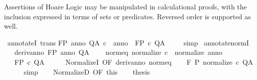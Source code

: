 \begin{isabellebody}
\begin{isamarkuptext}
 \medskip Assertions of Hoare Logic may be manipulated in
 calculational proofs, with the inclusion expressed in terms of sets
 or predicates.  Reversed order is supported as well.%
\end{isamarkuptext}\isamarkuptrue%
\isamarkupfalse%
\ annotateI\ {\isacharbrackleft}trans{\isacharbrackright}{\isacharcolon}\isanewline
{\isachardoublequoteopen}{\isasymlbrakk}{\isasymGamma}{\isacharcomma}{\isasymTheta}{\isasymturnstile}\isactrlbsub {\isacharslash}F\isactrlesub P\ anno\ Q{\isacharcomma}A{\isacharsemicolon}\ c\ {\isacharequal}\ anno{\isasymrbrakk}\ {\isasymLongrightarrow}\ {\isasymGamma}{\isacharcomma}{\isasymTheta}{\isasymturnstile}\isactrlbsub {\isacharslash}F\isactrlesub P\ c\ Q{\isacharcomma}A{\isachardoublequoteclose}\ \isanewline
%
\isadelimproof
\ \ %
\endisadelimproof
%
\isatagproof
{}\isamarkupfalse%
\ simp%
\endisatagproof
{\isafoldproof}%
%
\isadelimproof
\isanewline
%
\endisadelimproof
\isanewline
{}\isamarkupfalse%
\ annotate{\isacharunderscore}normI{\isacharcolon}\isanewline
\ \ \ deriv{\isacharunderscore}anno{\isacharcolon}\ {\isachardoublequoteopen}{\isasymGamma}{\isacharcomma}{\isasymTheta}{\isasymturnstile}\isactrlbsub {\isacharslash}F\isactrlesub P\ anno\ Q{\isacharcomma}A{\isachardoublequoteclose}\ \isanewline
\ \ \ norm{\isacharunderscore}eq{\isacharcolon}\ {\isachardoublequoteopen}normalize\ c\ {\isacharequal}\ normalize\ anno{\isachardoublequoteclose}\ \isanewline
\ \ \ {\isachardoublequoteopen}{\isasymGamma}{\isacharcomma}{\isasymTheta}{\isasymturnstile}\isactrlbsub {\isacharslash}F\isactrlesub P\ c\ Q{\isacharcomma}A{\isachardoublequoteclose}\isanewline
%
\isadelimproof
%
\endisadelimproof
%
\isatagproof
{}\isamarkupfalse%
\ {\isacharminus}\isanewline
\ \ \isamarkupfalse%
\ NormalizeI\ {\isacharbrackleft}OF\ deriv{\isacharunderscore}anno{\isacharbrackright}\ norm{\isacharunderscore}eq\isanewline
\ \ \isamarkupfalse%
\ {\isachardoublequoteopen}{\isasymGamma}{\isacharcomma}{\isasymTheta}{\isasymturnstile}\isactrlbsub {\isacharslash}F\ \isactrlesub P\ normalize\ c\ Q{\isacharcomma}A{\isachardoublequoteclose}\isanewline
\ \ \ \ \isamarkupfalse%
\ simp\isanewline
\ \ \isamarkupfalse%
\ NormalizeD\ {\isacharbrackleft}OF\ this{\isacharbrackright}\isanewline
\ \ \isamarkupfalse%
\ {\isacharquery}thesis\ \isacommand{{\isachardot}}\isamarkupfalse%
\isanewline
{}\isamarkupfalse%
%
\endisatagproof

\end{isabellebody}

